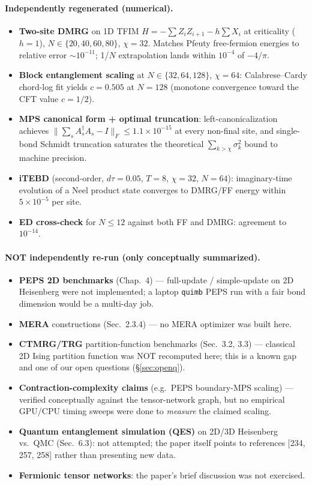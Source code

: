 \documentclass[11pt]{article}
\begin{document}
\paragraph{Independently regenerated (numerical).}
\begin{itemize}
  \item \textbf{Two-site DMRG} on 1D TFIM $H = -\sum Z_i Z_{i+1} - h\sum X_i$ at criticality ($h=1$), $N\in\{20,40,60,80\}$, $\chi=32$.
        Matches Pfeuty free-fermion energies to relative error $\sim 10^{-11}$; 1/$N$ extrapolation lands within $10^{-4}$ of $-4/\pi$.
  \item \textbf{Block entanglement scaling} at $N\in\{32,64,128\}$, $\chi=64$: Calabrese--Cardy chord-log fit yields $c=0.505$
        at $N{=}128$ (monotone convergence toward the CFT value $c{=}1/2$).
  \item \textbf{MPS canonical form + optimal truncation}: left-canonicalization achieves $\lVert\sum_s A_s^\dagger A_s - I\rVert_F \le 1.1\times 10^{-15}$
        at every non-final site, and single-bond Schmidt truncation saturates the theoretical $\sum_{k>\chi}\sigma_k^2$ bound to machine precision.
  \item \textbf{iTEBD} (second-order, $d\tau{=}0.05$, $T{=}8$, $\chi{=}32$, $N{=}64$): imaginary-time evolution of a Neel product state
        converges to DMRG/FF energy within $5\times 10^{-5}$ per site.
  \item \textbf{ED cross-check} for $N{\le}12$ against both FF and DMRG: agreement to $10^{-14}$.
\end{itemize}

\paragraph{NOT independently re-run (only conceptually summarized).}
\begin{itemize}
  \item \textbf{PEPS 2D benchmarks} (Chap.~4) --- full-update / simple-update on 2D Heisenberg were not implemented; a laptop \texttt{quimb} PEPS run
        with a fair bond dimension would be a multi-day job.
  \item \textbf{MERA} constructions (Sec.~2.3.4) --- no MERA optimizer was built here.
  \item \textbf{CTMRG/TRG} partition-function benchmarks (Sec.~3.2, 3.3) --- classical 2D Ising partition function was NOT recomputed here;
        this is a known gap and one of our open questions (\S\ref{sec:openq}).
  \item \textbf{Contraction-complexity claims} (e.g.\ PEPS boundary-MPS scaling) --- verified conceptually against the tensor-network graph, but no
        empirical GPU/CPU timing sweeps were done to \emph{measure} the claimed scaling.
  \item \textbf{Quantum entanglement simulation (QES)} on 2D/3D Heisenberg vs.\ QMC (Sec.~6.3): not attempted; the paper itself points to references
        [234, 257, 258] rather than presenting new data.
  \item \textbf{Fermionic tensor networks}: the paper's brief discussion was not exercised.
\end{itemize}
\end{document}
